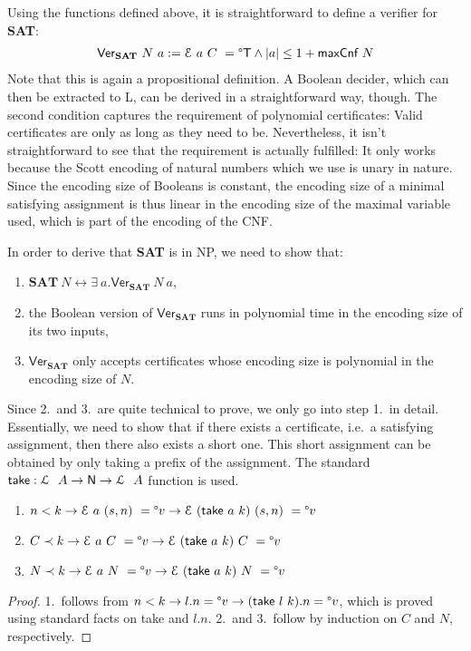 \documentclass[a4paper,UKenglish,cleveref, autoref]{lipics-v2019}
\begin{document}
Using the functions defined above, it is straightforward to define a verifier for \textbf{SAT}:
\begin{align*}
  \textsf{Ver}_{\textbf{SAT}}~N~a := \mathcal{E}~a~C~ = \degree\mathsf{T} \land |a| \le 1 +{\textsf{maxCnf}~N} 
\end{align*}
Note that this is again a propositional definition. A Boolean decider, which can then be extracted to L, can be derived in a straightforward way, though. The second condition captures the requirement of polynomial certificates: Valid certificates are only as long as they need to be. Nevertheless, it isn't straightforward to see that the requirement is actually fulfilled: It only works because the Scott encoding of natural numbers which we use is unary in nature. Since the encoding size of Booleans is constant, the encoding size of a minimal satisfying assignment is thus linear in the encoding size of the maximal variable used, which is part of the encoding of the CNF.

In order to derive that \textbf{SAT} is in NP, we need to show that:
\begin{enumerate}
  \item $\textbf{SAT}~N \leftrightarrow \exists~a. \textsf{Ver}_{\textbf{SAT}}~N~a$,
  \item the Boolean version of $\textsf{Ver}_\textbf{SAT}$ runs in polynomial time in the encoding size of its two inputs,
  \item $\textsf{Ver}_\textbf{SAT}$ only accepts certificates whose encoding size is polynomial in the encoding size of $N$.
\end{enumerate}

Since 2.\ and 3.\ are quite technical to prove, we only go into step 1.\ in detail. Essentially, we need to show that if there exists a certificate, i.e.\ a satisfying assignment, then there also exists a short one. This short assignment can be obtained by only taking a prefix of the assignment. The standard $\textsf{take} : \mathcal{L}~~A \rightarrow \mathsf{N} \rightarrow \mathcal{L}~~A$ function is used.

\begin{lemma}\label{prop:boundedcapassgn}\leavevmode
  \begin{enumerate}
    \item $n < k \rightarrow \mathcal{E}~a~(s, n)~ = \degree v \rightarrow \mathcal{E}~(\normalfont\textsf{take}~a~k)~(s, n)~ = \degree v$
    \item $C \prec k \rightarrow \mathcal{E}~a~C~ = \degree v \rightarrow \mathcal{E}~(\normalfont\textsf{take}~a~k)~C~ = \degree v$
    \item $N \prec k \rightarrow \mathcal{E}~a~N~ = \degree v \rightarrow \mathcal{E}~(\normalfont\textsf{take}~a~k)~N~ = \degree v$
  \end{enumerate}
\end{lemma}
\begin{proof}
  1.\ follows from $n < k \rightarrow l.n = \degree v \rightarrow (\textsf{take}~l~k).n = \degree v$, which is proved using standard facts on \textsf{take} and $l.n$.
  2.\ and 3.\ follow by induction on $C$ and $N$, respectively.
\end{proof}
\end{document}
